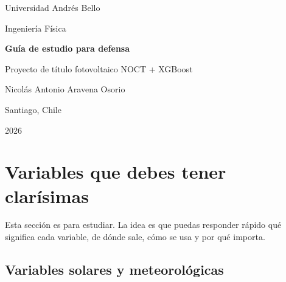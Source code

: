 \documentclass[11pt, letterpaper]{article}
\begin{document}
\begin{titlepage}
    \centering
    \vspace*{1.2cm}
    {\Large Universidad Andr\'es Bello\par}
    {\large Ingenier\'ia F\'isica\par}
    \vspace{1.5cm}
    {\LARGE \textbf{Gu\'ia de estudio para defensa}\par}
    \vspace{0.4cm}
    {\Large Proyecto de t\'itulo fotovoltaico NOCT + XGBoost\par}
    \vspace{1.2cm}
    {\large Nicol\'as Antonio Aravena Osorio\par}
    \vfill
    {\large Santiago, Chile\par}
    {\large 2026\par}
\end{titlepage}

\tableofcontents
\newpage

\section{Variables que debes tener clar\'isimas}

Esta secci\'on es para estudiar. La idea es que puedas responder r\'apido qu\'e significa cada variable, de d\'onde sale, c\'omo se usa y por qu\'e importa.

\subsection{Variables solares y meteorol\'ogicas}
\end{document}
